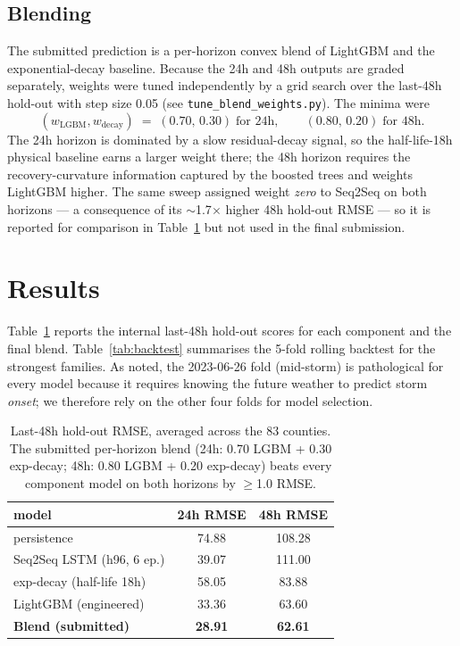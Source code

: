 \documentclass[11pt]{article}
\begin{document}
\subsection{Blending}

The submitted prediction is a per-horizon convex blend of LightGBM and
the exponential-decay baseline. Because the 24h and 48h outputs are
graded separately, weights were tuned independently by a grid search
over the last-48h hold-out with step size 0.05 (see
\texttt{tune\_blend\_weights.py}). The minima were
\[
(w_{\text{LGBM}},w_{\text{decay}})\;=\;(0.70,\,0.30)\;\text{for 24h},
\qquad (0.80,\,0.20)\;\text{for 48h}.
\]
The 24h horizon is dominated by a slow residual-decay signal, so the
half-life-18h physical baseline earns a larger weight there; the 48h
horizon requires the recovery-curvature information captured by the
boosted trees and weights LightGBM higher. The same sweep assigned
weight \emph{zero} to Seq2Seq on both horizons --- a consequence of its
$\sim$1.7$\times$ higher 48h hold-out RMSE --- so it is reported for
comparison in Table~\ref{tab:holdout} but not used in the final
submission.

\section{Results}

Table~\ref{tab:holdout} reports the internal last-48h hold-out scores for
each component and the final blend. Table~\ref{tab:backtest} summarises
the 5-fold rolling backtest for the strongest families. As noted, the
2023-06-26 fold (mid-storm) is pathological for every model because it
requires knowing the future weather to predict storm \emph{onset}; we
therefore rely on the other four folds for model selection.

\begin{table}[h]
\centering
\begin{tabular}{lcc}
\toprule
model & 24h RMSE & 48h RMSE \\
\midrule
persistence                & 74.88 & 108.28 \\
Seq2Seq LSTM (h96, 6 ep.)  & 39.07 & 111.00 \\
exp-decay (half-life 18h)  & 58.05 & 83.88 \\
LightGBM (engineered)      & 33.36 & 63.60 \\
\textbf{Blend (submitted)} & \textbf{28.91} & \textbf{62.61} \\
\bottomrule
\end{tabular}
\caption{Last-48h hold-out RMSE, averaged across the 83 counties. The
submitted per-horizon blend (24h: 0.70 LGBM + 0.30 exp-decay; 48h: 0.80
LGBM + 0.20 exp-decay) beats every component model on both horizons by
$\ge$1.0 RMSE.\label{tab:holdout}}
\end{table}
\end{document}
